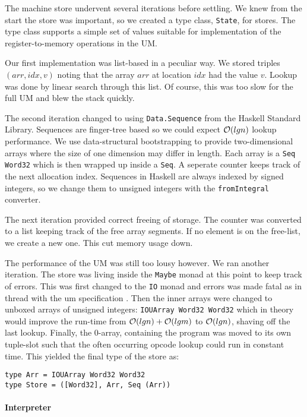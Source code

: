 The machine store undervent several iterations before settling. We
knew from the start the store was important, so we created a type
class, \texttt{State}, for stores. The type class supports a simple
set of values suitable for implementation of the register-to-memory
operations in the UM.

Our first implementation was list-based in a peculiar way. We stored
triples $(arr, idx, v)$ noting that the array $arr$ at location $idx$
had the value $v$. Lookup was done by linear search through this
list.  Of course, this was too slow for the
full UM and blew the stack quickly.

The second iteration changed to using \texttt{Data.Sequence} from the
Haskell Standard Library. Sequences are finger-tree based so we could
expect $\mathcal{O}(lg n)$ lookup performance. We use data-structural
bootstrapping \cite{okasaki+pfds} to provide two-dimensional arrays
where the size of one dimension may differ in length. Each array is a
\texttt{Seq Word32} which is then wrapped up inside a \texttt{Seq}. A
seperate counter keeps track of the next allocation index. Sequences
in Haskell are always indexed by signed integers, so we change them to
unsigned integers with the \texttt{fromIntegral} converter.

The next iteration provided correct freeing of storage. The counter
was converted to a list keeping track of the free array segments. If
no element is on the free-list, we create a new one. This cut memory
usage down.

The performance of the UM was still too lousy however. We ran
another iteration. The store was living inside the \texttt{Maybe}
monad at this point to keep track of errors. This was first changed to the
\texttt{IO} monad and errors was made fatal as in thread with the um
specification \cite{um+spec}. Then the inner arrays were changed to
unboxed arrays of unsigned integers: \texttt{IOUArray Word32 Word32}
which in theory would improve the run-time from $\mathcal{O}(lg n) + \mathcal{O}(lg
  m)$ to $\mathcal{O}(lg n)$, shaving off the last lookup. Finally, the
$0$-array, containing the program was moved to its own tuple-slot such
that the often occurring opcode lookup could run in constant
time. This yielded the final type of the store as:
\begin{verbatim}
type Arr = IOUArray Word32 Word32
type Store = ([Word32], Arr, Seq (Arr))
\end{verbatim}

\paragraph{Interpreter}
\label{sec:interpreter}

